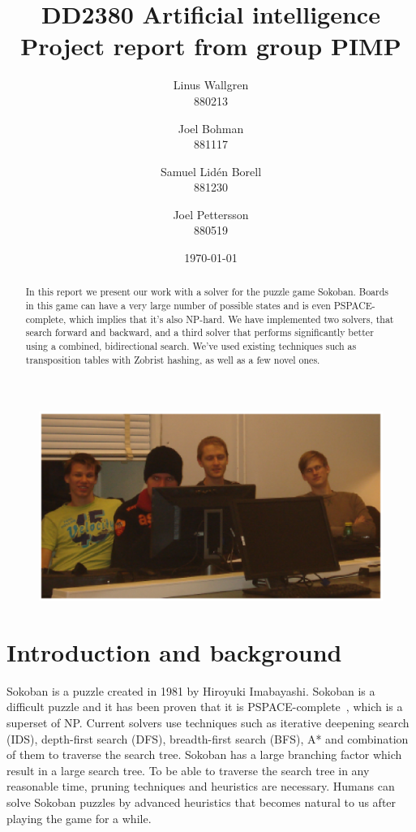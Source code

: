 \documentclass[a4paper,11pt]{article}
\title{
    {\sc DD2380 Artificial intelligence} \\
    Project report from group PIMP
}
\author{
    Linus Wallgren \\ 880213 \and
    Joel Bohman \\ 881117 \and
    Samuel Lidén Borell \\ 881230 \and
    Joel Pettersson \\ 880519 
}
\date{\today}
\renewcommand{\*}[0]{\cdot}
\begin{document}
\maketitle

\begin{figure}[h!]
    \begin{center}
        \includegraphics{figures/gruppbild}
    \end{center}
\end{figure}

\thispagestyle{empty}
\newpage
\begin{abstract}
    In this report we present our work with a solver for the puzzle game
    Sokoban. Boards in this game can have a very large number of possible
    states and is even PSPACE-complete, which implies that it's also NP-hard.
    We have implemented two solvers, that search forward and backward, and a
    third solver that performs significantly better using a combined,
    bidirectional search. We've used existing techniques such as transposition
    tables with Zobrist hashing, as well as a few novel ones.
\end{abstract}
\thispagestyle{empty}
\newpage
\setcounter{page}{1}


\part*{Introduction and background}


Sokoban is a puzzle created in 1981 by Hiroyuki Imabayashi. Sokoban is a
difficult puzzle and it has been proven that it is
PSPACE-complete~\cite{culberson1997}, which is a superset of NP. Current
solvers use techniques such as iterative deepening search (IDS), depth-first
search (DFS), breadth-first search (BFS), A* and combination of them to
traverse the search tree. Sokoban has a large branching factor which result in
a large search tree. To be able to traverse the search tree in any reasonable
time, pruning techniques and heuristics are necessary. Humans can solve
Sokoban puzzles by advanced heuristics that becomes natural to us after playing
the game for a while.
\end{document}
